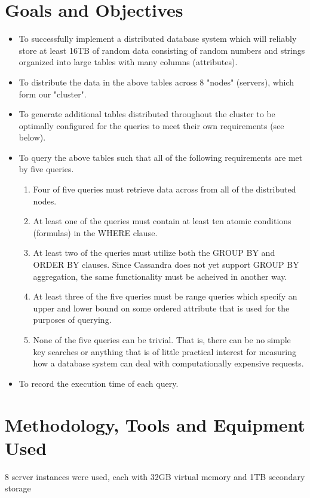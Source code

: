 \documentclass[letterpaper]{article}
\begin{document}
\section{Goals and Objectives}
\begin{itemize}
	\item To successfully implement a distributed database system which
		will reliably store at least 16TB of random data consisting of
		random numbers and strings organized into large tables with
		many columns (attributes).
	\item To distribute the data in the above tables across 8 "nodes"
		(servers), which form our "cluster".
	\item To generate additional tables distributed throughout the cluster
		to be optimally configured for the queries to meet their own
		requirements (see below).

	\item To query the above tables such that all of the following requirements
		are met by five queries.
		\begin{enumerate}
			\item Four of five queries must retrieve data across from all of the distributed nodes.
			\item At least one of the queries must contain at least ten atomic
				conditions (formulas) in the WHERE clause.
			\item At least two of the queries must utilize both the GROUP BY and
				ORDER BY clauses. Since Cassandra does not yet support GROUP BY
				aggregation, the same functionality must be acheived in another
				way.
			\item At least three of the five queries must be range queries which
				specify an upper and lower bound on some ordered attribute that
				is used for the purposes of querying.
			\item None of the five queries can be trivial. That is, there can be
				no simple key searches or anything that is of little practical
				interest for measuring how a database system can deal with
				computationally expensive requests.
		\end{enumerate}

	\item To record the execution time of each query.
\end{itemize}

\section{Methodology, Tools and Equipment Used}
8 server instances were used, each with 32GB virtual memory and 1TB secondary storage 
\end{document}
